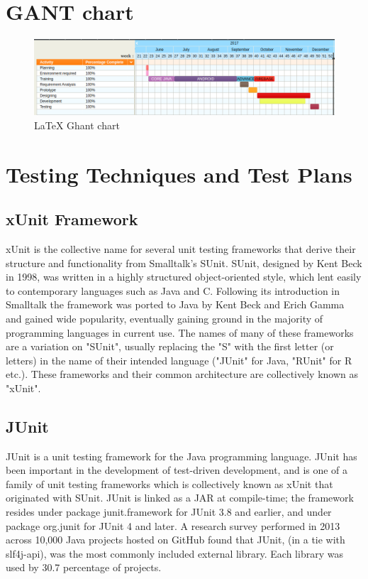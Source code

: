 	\section{GANT chart
	}
	\begin{figure}[ht]
\centering
\includegraphics[scale=0.35]{images/ghant.png}
\caption{\LaTeX{} Ghant chart}
\end{figure}
	
	\section{Testing Techniques and Test Plans
}
\subsection{xUnit Framework}
xUnit is the collective name for several unit testing frameworks that derive their structure and functionality from Smalltalk's SUnit. SUnit, designed by Kent Beck in 1998, was written in a highly structured object-oriented style, which lent easily to contemporary languages such as Java and C. Following its introduction in Smalltalk the framework was ported to Java by Kent Beck and Erich Gamma and gained wide popularity, eventually gaining ground in the majority of programming languages in current use. The names of many of these frameworks are a variation on "SUnit", usually replacing the "S" with the first letter (or letters) in the name of their intended language ("JUnit" for Java, "RUnit" for R etc.). These frameworks and their common architecture are collectively known as "xUnit".
\subsection{JUnit}
JUnit is a unit testing framework for the Java programming language. JUnit has been important in the development of test-driven development, and is one of a family of unit testing frameworks which is collectively known as xUnit that originated with SUnit. JUnit is linked as a JAR at compile-time; the framework resides under package junit.framework for JUnit 3.8 and earlier, and under package org.junit for JUnit 4 and later. A research survey performed in 2013 across 10,000 Java projects hosted on GitHub found that JUnit, (in a tie with slf4j-api), was the most commonly included external library. Each library was used by 30.7 percentage of projects.

